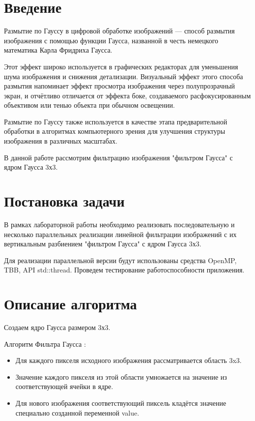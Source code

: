 \documentclass{report}
\begin{document}
\setcounter{page}{2}

\tableofcontents
\newpage

\section*{Введение}
Размытие по Гауссу в цифровой обработке изображений — способ размытия изображения с помощью функции Гаусса, названной в честь немецкого математика Карла Фридриха Гаусса.

Этот эффект широко используется в графических редакторах для уменьшения шума изображения и снижения детализации. Визуальный эффект этого способа размытия напоминает эффект просмотра изображения через полупрозрачный экран, и отчётливо отличается от эффекта боке, создаваемого расфокусированным объективом или тенью объекта при обычном освещении.

Размытие по Гауссу также используется в качестве этапа предварительной обработки в алгоритмах компьютерного зрения для улучшения структуры изображения в различных масштабах.
\par В данной  работе рассмотрим фильтрацию изображения "фильтром Гаусса" с ядром Гаусса 3х3.
\newpage

\section*{Постановка задачи}
В рамках лабораторной работы необходимо реализовать последовательную и несколько параллельных реализации линейной фильтрации изображений с их вертикальным разбиением "фильтром Гаусса" с ядром Гаусса 3х3. 
\par Для реализации параллельной версии будут использованы средства OpenMP, TBB, API std::thread. Проведем тестирование работоспособности приложения.
\newpage

\section*{Описание алгоритма}
\par 
Создаем ядро Гаусса размером 3х3. 
\par Алгоритм Фильтра Гаусса :
\begin{itemize}
\item Для каждого пикселя исходного изображения рассматривается область 3x3. 
\item Значение каждого пикселя из этой области умножается на значение из соответствующей ячейки в ядре. 
\item Для нового изображения соответствующий пиксель кладётся значение специально созданной переменной value.
\end{itemize}
\newpage
\end{document}

